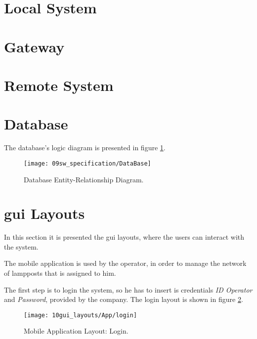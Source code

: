 \section{Local System}


\clearpage
\section{Gateway}


\clearpage
\section{Remote System}


\clearpage
\section{Database}
The database's logic diagram is presented in figure \ref{fig:database_er}.

\begin{figure}[H]
	\centering	
	\texttt{[image: 09sw\_specification/DataBase]}
	\caption{Database Entity-Relationship Diagram.}
	\label{fig:database_er}
\end{figure}



\clearpage
\section{\ac{gui} Layouts}
In this section it is presented the \ac{gui} layouts, where the users can interact with the system.


The mobile application is used by the operator, in order to manage the network of lampposts that is assigned to him. 

The first step is to login the system, so he has to insert is credentials \textit{ID Operator} and \textit{Password}, provided by the company. The login layout is shown in figure \ref{fig:login}.

\begin{figure}[H]
	\centering	
	\texttt{[image: 10gui\_layouts/App/login]}
	\caption{Mobile Application Layout: Login.}
	\label{fig:login}
\end{figure}

